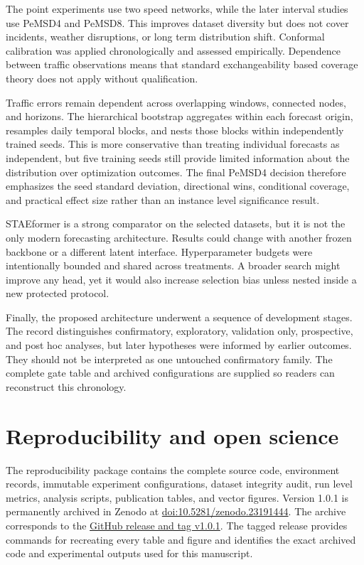 \documentclass[pdflatex,sn-mathphys-num]{sn-jnl}
\begin{document}
The point experiments use two speed networks, while the later interval studies use PeMSD4 and PeMSD8. This improves dataset diversity but does not cover incidents, weather disruptions, or long term distribution shift. Conformal calibration was applied chronologically and assessed empirically. Dependence between traffic observations means that standard exchangeability based coverage theory does not apply without qualification.

Traffic errors remain dependent across overlapping windows, connected nodes, and horizons. The hierarchical bootstrap aggregates within each forecast origin, resamples daily temporal blocks, and nests those blocks within independently trained seeds. This is more conservative than treating individual forecasts as independent, but five training seeds still provide limited information about the distribution over optimization outcomes. The final PeMSD4 decision therefore emphasizes the seed standard deviation, directional wins, conditional coverage, and practical effect size rather than an instance level significance result.

STAEformer is a strong comparator on the selected datasets, but it is not the only modern forecasting architecture. Results could change with another frozen backbone or a different latent interface. Hyperparameter budgets were intentionally bounded and shared across treatments. A broader search might improve any head, yet it would also increase selection bias unless nested inside a new protected protocol.

Finally, the proposed architecture underwent a sequence of development stages. The record distinguishes confirmatory, exploratory, validation only, prospective, and post hoc analyses, but later hypotheses were informed by earlier outcomes. They should not be interpreted as one untouched confirmatory family. The complete gate table and archived configurations are supplied so readers can reconstruct this chronology.

\section{Reproducibility and open science}\label{sec:reproducibility}

The reproducibility package contains the complete source code, environment records, immutable experiment configurations, dataset integrity audit, run level metrics, analysis scripts, publication tables, and vector figures. Version 1.0.1 is permanently archived in Zenodo at \href{https://doi.org/10.5281/zenodo.23191444}{doi:10.5281/zenodo.23191444}. The archive corresponds to the \href{https://github.com/shishirbit/Quantum-Enhanced-Framework-for-Traffic-Speed-Forecasting-with-Calibrated-Uncertainty/releases/tag/v1.0.1}{GitHub release and tag v1.0.1}. The tagged release provides commands for recreating every table and figure and identifies the exact archived code and experimental outputs used for this manuscript.
\end{document}
